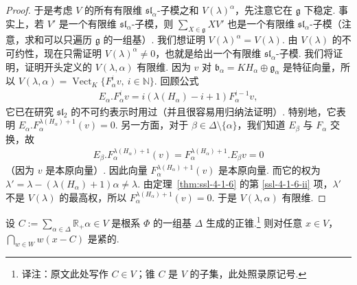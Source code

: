 \begin{proof}
于是考虑 $V$ 的所有有限维 $\mathfrak{sl}_\alpha$-子模之和 $V(\lambda)^\alpha$，先注意它在 $\mathfrak g$ 下稳定. 事实上，若 $V'$ 是一个有限维 $\mathfrak{sl}_\alpha$-子模，则 $\sum_{X\in\mathfrak g}XV'$ 也是一个有限维 $\mathfrak{sl}_\alpha$-子模（注意，求和可以只遍历 $\mathfrak g$ 的一组基）. 我们想证明 $V(\lambda)^\alpha=V(\lambda)$. 由 $V(\lambda)$ 的不可约性，现在只需证明 $V(\lambda)^\alpha\neq0$，也就是给出一个有限维 $\mathfrak{sl}_\alpha$-子模.
我们将证明，证明开头定义的 $V(\lambda,\alpha)$ 有限维. 因为 $v$ 对 $\mathfrak b_\alpha=KH_\alpha\oplus\mathfrak g_\alpha$ 是特征向量，所以 $V(\lambda,\alpha)=\operatorname{Vect}_K\{F_\alpha^iv,\ i\in\mathbb N\}$. 回顾公式
\begin{align*}
E_\alpha.F_\alpha^iv=i(\lambda(H_\alpha)-i+1)F_\alpha^{i-1}v,
\end{align*}
它已在研究 $\mathfrak{sl}_2$ 的不可约表示时用过（并且很容易用归纳法证明）. 特别地，它表明 $E_\alpha.F_\alpha^{\lambda(H_\alpha)+1}(v)=0$. 另一方面，对于 $\beta\in\Delta\setminus\{\alpha\}$，我们知道 $E_\beta$ 与 $F_\alpha$ 交换，故
\begin{align*}
E_\beta.F_\alpha^{\lambda(H_\alpha)+1}(v)=F_\alpha^{\lambda(H_\alpha)+1}.E_\beta v=0
\end{align*}
（因为 $v$ 是本原向量）. 因此向量 $F_\alpha^{\lambda(H_\alpha)+1}(v)$ 是本原向量. 而它的权为 $\lambda'=\lambda-(\lambda(H_\alpha)+1)\alpha\neq\lambda$. 由定理~\ref{thm:ssl-4-1-6} 的第 \ref{ssl-4-1-6-ii} 项，$\lambda'$ 不是 $V(\lambda)$ 的最高权，所以 $F_\alpha^{\lambda(H_\alpha)+1}(v)=0$. 于是 $V(\lambda,\alpha)$ 有限维.
\end{proof}
\begin{lemma*}
设 $C:=\sum_{\alpha\in\Delta}\mathbb R_+\alpha\in V$ 是根系 $\Phi$ 的一组基 $\Delta$ 生成的正锥.\footnote{译注：原文此处写作 $C\in V$；锥 $C$ 是 $V$ 的子集，此处照录原记号.}
则对任意 $x\in V$，$\bigcap_{w\in W}w(x-C)$ 是紧的.
\end{lemma*}
